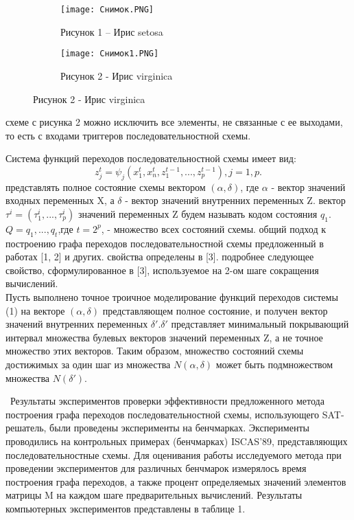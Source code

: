 \documentclass[13pt]{article}
\begin{document}
\begin{figure}[h!]
\centering
\begin{subfigure}{.5\textwidth}
  \centering
  \texttt{[image: Снимок.PNG]}
  \caption{Рисунок 1 – Ирис setosa}
  \label{рисунок 1}
\end{subfigure}%
\begin{subfigure}{.5\textwidth}
  \centering
  \texttt{[image: Снимок1.PNG]}
  \caption{ Рисунок 2 - Ирис virginica}
  \label{fig:sub2}
\end{subfigure}
\label{рисунок 2}
\end{figure}
\begin{Large}
 схеме с рисунка 2 можно исключить все элементы, не
связанные с ее выходами, то есть с входами триггеров
последовательностной схемы.

Система функций переходов последовательностной схемы имеет
вид:
\newpage
$$z^t_j=\psi_j(x^t_1,x^t_n,z^{t-1}_1,...,z^{t-1}_p),j=1,p.$$
 представлять полное состояние схемы вектором $(\alpha, \delta)$, где $\alpha$ - вектор значений входных переменных X, а $ \delta$ - вектор значений внутренних переменных Z.
 вектор $\tau^i=(\tau^i_1,...,\tau^i_p)$ значений переменных Z будем называть кодом состояния $q_1$.$Q={q_1,...,q_t}$,где $t=2^p$, - множество всех состояний схемы.
 общий подход к построению графа переходов последовательностной схемы предложенный в работах [1, 2] и других.
 свойства определены в [3].
 подробнее следующее свойство, сформулированное в [3], используемое на 2-ом шаге сокращения вычислений.
\\Пусть выполнено точное троичное моделирование функций переходов системы (1) на векторе $(\alpha, \delta)$ представляющем полное состояние, и получен вектор значений внутренних переменных $ \delta'$.$ \delta'$ представляет минимальный покрывающий интервал множества булевых векторов значений переменных Z, а не точное множество этих векторов. Таким образом, множество состояний схемы достижимых за один шаг из множества $N(\alpha,\delta)$ может быть подмножеством множества $N(\delta')$.
\par{\ Результаты экспериментов}
 проверки эффективности предложенного метода построения графа переходов последовательностной схемы, использующего SAT-решатель, были проведены эксперименты на бенчмарках. Эксперименты проводились на контрольных примерах (бенчмарках) ISCAS’89, представляющих последовательностные схемы. Для оценивания работы исследуемого метода при проведении экспериментов для различных бенчмарок измерялось время построения графа переходов, а также процент определяемых значений элементов матрицы M на каждом шаге предварительных вычислений. Результаты компьютерных экспериментов представлены в таблице 1. 
\end{Large}
\end{document}
